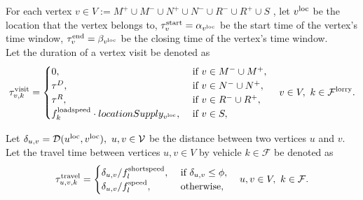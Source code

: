 For each vertex
$v \in V := M^{+} \cup M^{-} \cup N^{+} \cup N^{-} \cup  R^- \cup R^+ \cup S $ ,
let $v^{\rm loc}$
be the location that the vertex belongs to,
$\tau^{\rm start}_v = \alpha_{v^{\rm loc}}$
be the start time of the vertex's time window,
$\tau^{\rm end}_v = \beta_{v^{\rm loc}}$
be the closing time of the vertex's time window.
\\
%
%


Let the duration of a vertex visit be denoted as
\begin{align}
  \tau^{\rm visit}_{v,k} =
  \begin{cases}
    0      , & \text{ if }   v \in M^- \cup M^+,  \\
    \tau^D , & \text{ if }   v \in N^- \cup N^+,  \\
    \tau^R , & \text{ if }   v \in R^- \cup R^+, \\
    f_k^{\rm loadspeed} \cdot locationSupply_{v^{\rm loc}},
     & \text{ if }   v \in S ,
  \end{cases}
  \quad v \in V,
  \ k \in \mathcal F^{\rm lorry}.
\end{align}

Let
$\delta_{u,v} = \mathcal D(u^{\rm loc},v^{\rm loc}) , \ u,v \in \mathcal V$
be the distance between two vertices $u$ and $v$. \\


Let the travel time between vertices $u,v \in V$ by vehicle $k \in \mathcal F$  be denoted as
\begin{align}
  \tau^{\rm travel}_{u,v,k} =
  \begin{cases}
    \delta_{u,v} / f_l^{\rm shortspeed} ,
    & \text{ if }   \delta_{u,v} \leq \phi,  \\
    \delta_{u,v} / f_l^{\rm speed} ,
    & \text{  otherwise},
  \end{cases}
  \quad u,v \in V,
  \ k \in \mathcal F.
\end{align}




